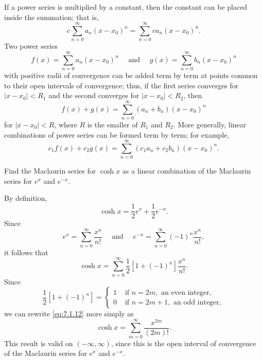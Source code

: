 
\noindent
If a power series is multiplied by a constant, then the constant can be placed inside the summation;
that is,
\[
  c\sum_{n=0}^{\infty}a_{n}(x-x_{0})^{n}=\sum_{n=0}^{\infty}ca_{n}(x-x_{0})^{n}.
\]
Two power series
\[
  f(x)=\sum_{n=0}^{\infty}a_{n}(x-x_{0})^{n}\quad\mbox{ and }\quad g(x)=\sum_{n=0}^{\infty}b_{n}(x-x_{0})^{n}
\]
with positive radii of convergence can be added term by term at points common to their open
intervals of convergence; thus, if the first series converges for $|x-x_{0}|<R_{1}$ and the second
converges for $|x-x_{0}|<R_{2}$, then
\[
  f(x)+g(x)=\sum_{n=0}^{\infty}(a_{n}+b_{n})(x-x_{0})^{n}
\]
for $|x-x_{0}|<R$, where $R$ is the smaller of $R_{1}$ and $R_{2}$. More generally, linear
combinations of power series can be formed term by term; for example,
\[
  c_{1}f(x)+c_{2}g(x)=\sum_{n=0}^{\infty}(c_{1}a_{n}+c_{2}b_{n})(x-x_{0})^{n}.
\]

\begin{example}
  \label{example:7.1.5} \rm Find the Maclaurin series for $\cosh x$ as a linear combination of the
  Maclaurin series for $e^{x}$ and $e^{-x}$.
\end{example}

\begin{examplesolution}
\solution By definition,
\[
  \cosh x=\frac{1}{2}e^{x}+\frac{1}{2}e^{-x}.
\]
Since
\[
  e^{x}=\sum_{n=0}^{\infty}\frac{x^{n}}{n!}\quad\mbox{ and }\quad e^{-x}=\sum_{n=0}^{\infty}(-1)^{n}\frac{x^{n}}{n!},
\]
it follows that
\begin{equation}
  \label{eq:7.1.12}\cosh x=\sum_{n=0}^{\infty}\frac{1}{2}[1+(-1)^{n}]{\frac{x^{n}}{n!}}.
\end{equation}
Since
\[
  \frac{1}{2}[1+(-1)^{n}]=\left\{
  \begin{array}{cl}
    1 & \mbox{ if }n=2m,\mbox{ an even integer},  \\
    0 & \mbox{ if }n=2m+1,\mbox{ an odd integer},
  \end{array}\right.
\]
we can rewrite \eqref{eq:7.1.12} more simply as
\[
  \cosh x=\sum_{m=0}^{\infty}\frac{x^{2m}}{(2m)!}.
\]
This result is valid on $(-\infty,\infty)$, since this is the open interval of convergence of the
Maclaurin series for $e^{x}$ and $e^{-x}$.
\end{examplesolution}

